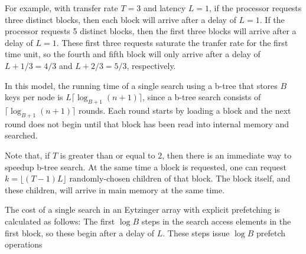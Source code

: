 \documentclass{patmorin}
\begin{document}
For example, with transfer rate $T=3$ and latency $L=1$, if the processor
requests three distinct blocks, then each block will arrive after a
delay of $L=1$.  If the processor requests 5 distinct blocks, then
the first three blocks will arrive after a delay of $L=1$. These first
three requests saturate the tranfer rate for the first time unit, so
the fourth and fifth block will only arrive after a delay of $L+1/3=4/3$
and $L+2/3=5/3$, respectively.

In this model, the running time of a single search using a b-tree that
stores $B$ keys per node is $L\lceil\log_{B+1}(n+1)\rceil$, since a
b-tree search consists of $\lceil\log_{B+1}(n+1)\rceil$ rounds. Each
round starts by loading a block and the next round does not begin until
that block has been read into internal memory and searched.

Note that, if $T$ is greater than or equal to $2$, then there is an
immediate way to speedup b-tree search. At the same time a block is
requested, one can request $k=\lfloor (T-1)L\rfloor$ randomly-chosen
children of that block.  The block itself, and these children, will
arrive in main memory at the same time.  

The cost of a single search in an Eytzinger array with explicit
prefetching is calculated as follows:  The first $\log B$ steps in the
search access elements in the first block, so these begin after a delay
of $L$. These steps issue $\log B$ prefetch operations
\end{document}
